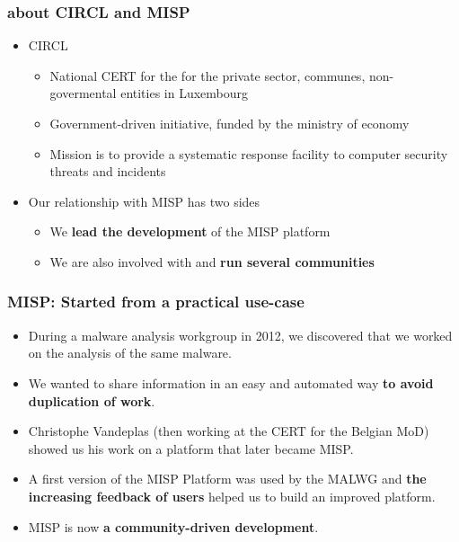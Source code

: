 
\begin{frame}[t,plain]
\titlepage
\end{frame}

\begin{frame}
    \frametitle{about CIRCL and MISP}
    \begin{itemize}
        \item CIRCL
        \begin{itemize}
            \item National CERT for the for the private sector, communes, non-govermental entities in Luxembourg
            \item Government-driven initiative, funded by the ministry of economy
            \item Mission is to provide a systematic response facility to computer security threats and incidents
        \end{itemize}
        \item Our relationship with MISP has two sides
        \begin{itemize}
            \item We {\bf lead the development} of the MISP platform
            \item We are also involved with and {\bf run several communities}
        \end{itemize}
    \end{itemize}
\end{frame}

\begin{frame}
 \frametitle{MISP: Started from a practical use-case}
 \begin{itemize}
         \item During a malware analysis workgroup in 2012, we discovered that we worked on the analysis of the same malware.
         \item We wanted to share information in an easy and automated way {\bf to avoid duplication of work}.
         \item Christophe Vandeplas (then working at the CERT for the Belgian MoD) showed us his work on a platform that later became MISP.
         \item A first version of the MISP Platform was used by the MALWG and {\bf the increasing feedback of users} helped us to build an improved platform.
         \item MISP is now {\bf a community-driven development}.
 \end{itemize}
\end{frame}

